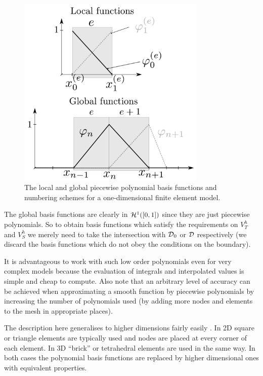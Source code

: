 \begin{figure}
  \center
  \includegraphics[width=0.8\textwidth]{./images/local_global_functions}
  \caption{The local and global piecewise polynomial basis functions and numbering schemes for a one-dimensional finite element model.
  }
  \label{fig:local_global_functions}
\end{figure}

The global basis functions are clearly in $\mathcal{H}^1([0,1])$ since they are just piecewise polynomials.
So to obtain basis functions which satisfy the requirements on $V_T^h$ and $V_S^h$ we merely need to take the intersection with $\mathcal{D}_0$ or $\mathcal{D}$ respectively (\ie we discard the basis functions which do not obey the conditions on the boundary).

It is advantageous to work with such low order polynomials even for very complex models because the evaluation of integrals and interpolated values is simple and cheap to compute.
Also note that an arbitrary level of accuracy can be achieved when approximating a smooth function by piecewise polynomials by increasing the number of polynomials used (\ie by adding more nodes and elements to the mesh in appropriate places).

The description here generalises to higher dimensions fairly easily \cite[20]{HowardElmanDavidSilvester2006}.
In 2D square or triangle elements are typically used and nodes are placed at every corner of each element.
In 3D ``brick'' or tetrahedral elements are used in the same way.
In both cases the polynomial basis functions are replaced by higher dimensional ones with equivalent properties.

